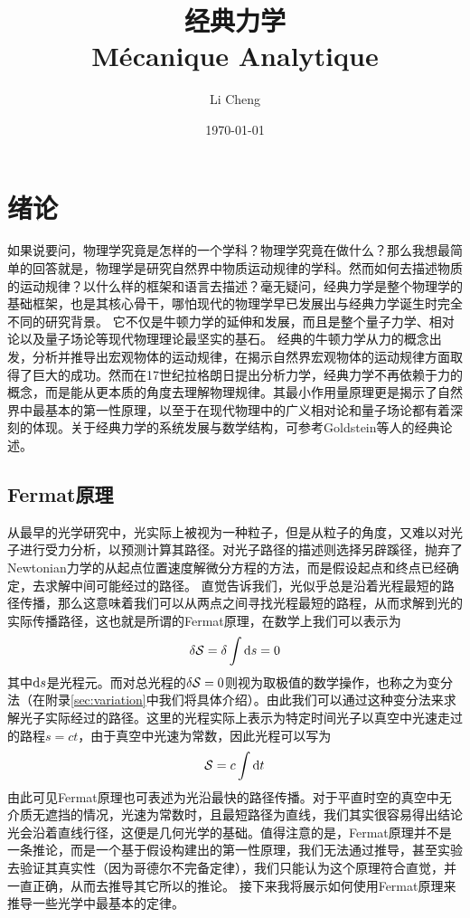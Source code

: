 \documentclass[12pt,openany]{book}
\title{\textbf{{\Huge 经典力学}\\{\Huge M\'ecanique Analytique}}}
\author{Li Cheng}
\date{\today}
\begin{document}
\maketitle
\frontmatter
\tableofcontents
\mainmatter

\chapter{绪论}
\label{chap:intro}
如果说要问，物理学究竟是怎样的一个学科？物理学究竟在做什么？那么我想最简单的回答就是，物理学是研究自然界中物质运动规律的学科。然而如何去描述物质的运动规律？以什么样的框架和语言去描述？毫无疑问，经典力学是整个物理学的基础框架，也是其核心骨干，哪怕现代的物理学早已发展出与经典力学诞生时完全不同的研究背景。
它不仅是牛顿力学的延伸和发展，而且是整个量子力学、相对论以及量子场论等现代物理理论最坚实的基石。
经典的牛顿力学从力的概念出发，分析并推导出宏观物体的运动规律，在揭示自然界宏观物体的运动规律方面取得了巨大的成功。然而在17世纪拉格朗日提出分析力学，经典力学不再依赖于力的概念，而是能从更本质的角度去理解物理规律。其最小作用量原理更是揭示了自然界中最基本的第一性原理，以至于在现代物理中的广义相对论和量子场论都有着深刻的体现。关于经典力学的系统发展与数学结构，可参考Goldstein等人的经典论述\cite{landau1976, goldstein2002}。


\section{Fermat原理}
\label{sec:fermat}

从最早的光学研究中，光实际上被视为一种粒子，但是从粒子的角度，又难以对光子进行受力分析，以预测计算其路径。对光子路径的描述则选择另辟蹊径，抛弃了Newtonian力学的从起点位置速度解微分方程的方法，而是假设起点和终点已经确定，去求解中间可能经过的路径。
直觉告诉我们，光似乎总是沿着光程最短的路径传播，那么这意味着我们可以从两点之间寻找光程最短的路程，从而求解到光的实际传播路径，这也就是所谓的Fermat原理，在数学上我们可以表示为
\begin{equation}
   \delta \mathcal{S} = \delta \int \mathrm{d} s =0\label{eq:fermat}
\end{equation}
其中\(\mathrm{d} s\)是光程元。而对总光程的$\delta\mathcal{S}=0$则视为取极值的数学操作，也称之为变分法（在附录\ref{sec:variation}中我们将具体介绍）。由此我们可以通过这种变分法来求解光子实际经过的路径。这里的光程实际上表示为特定时间光子以真空中光速走过的路程$s = ct$，由于真空中光速为常数，因此光程可以写为
\begin{equation}
   \action = c\int \bd t %
\end{equation}
由此可见Fermat原理也可表述为光沿最快的路径传播。对于平直时空的真空中无介质无遮挡的情况，光速为常数时，且最短路径为直线，我们其实很容易得出结论光会沿着直线行径，这便是几何光学的基础。值得注意的是，Fermat原理并不是一条推论，而是一个基于假设构建出的第一性原理，我们无法通过推导，甚至实验去验证其真实性（因为哥德尔不完备定律），我们只能认为这个原理符合直觉，并一直正确，从而去推导其它所以的推论。
接下来我将展示如何使用Fermat原理来推导一些光学中最基本的定律。
\end{document}
